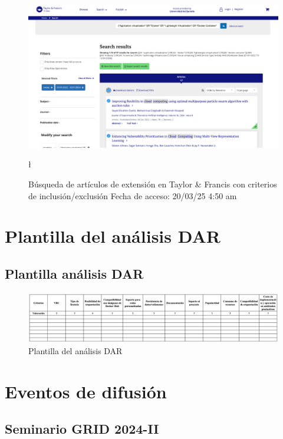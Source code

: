 \FloatBarrier\begin{figure}[H]
    \centering
    \includegraphics[width=\textwidth,keepaspectratio]{apendices/BD/criterios/TF-ind.png}
    \caption{Búsqueda de artículos de extensión en Taylor \& Francis con criterios de inclusión/exclusión
    Fecha de acceso: 20/03/25 4:50 am
    }\l
\end{figure}
\FloatBarrier\chapter{Plantilla del análisis DAR}
\section{Plantilla análisis DAR}

\begin{figure}[H]
    \centering
    \includegraphics[width=\textwidth,height=0.85\textheight,keepaspectratio]{apendices/plantilla-DAR.png}
    \caption{Plantilla del análisis DAR}\label{fig:tabla-plantilla-dar}
\end{figure}
\FloatBarrier\chapter{Eventos de difusión}
\section{Seminario GRID 2024-II}


